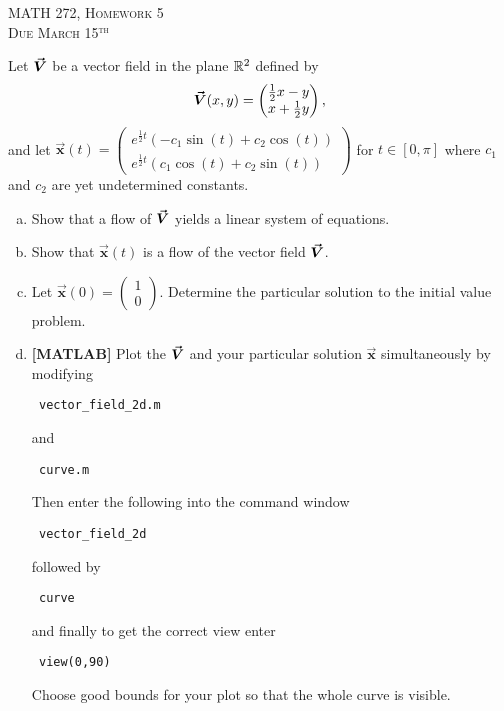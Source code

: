 \documentclass[12pt]{article} %
\newcommand{\vecx}{\boldsymbol{\vec{x}}}
\begin{document}
\begin{center}
   \textsc{\large MATH 272, Homework 5}\\
   \textsc{Due March 15$^\textrm{th}$}
\end{center}
\vspace{.5cm}


\begin{problem}
Let $\boldsymbol{\vec{V}}$ be a vector field in the plane $\mathbb{R}^2$ defined by
\[
\boldsymbol{\vec{V}}(x,y) = \begin{pmatrix} \frac{1}{2}x-y \\ x + \frac{1}{2}y \end{pmatrix},
\]
and let $\vecx(t) = \begin{pmatrix}  e^{\frac{1}{2}t} (-c_1 \sin(t) + c_2 \cos(t) ) \\ e^{\frac{1}{2}t} (c_1 \cos(t) + c_2 \sin(t)) \end{pmatrix}$ for $t\in [0,\pi]$ where $c_1$ and $c_2$ are yet undetermined constants.
\begin{enumerate}[(a)]
    \item Show that a flow of $\boldsymbol{\vec{V}}$ yields a linear system of equations.
    \item Show that $\vecx(t)$ is a flow of the vector field $\boldsymbol{\vec{V}}$.
    \item Let $\vecx(0)=\begin{pmatrix} 1 \\ 0 \end{pmatrix}$. Determine the particular solution to the initial value problem.
    \item \textbf{[MATLAB]} Plot the $\boldsymbol{\vec{V}}$ and your particular solution $\vecx$ simultaneously by modifying 
\begin{verbatim} vector_field_2d.m \end{verbatim}
 and
 \begin{verbatim} curve.m \end{verbatim} 
Then enter the following into the command window
\begin{verbatim} vector_field_2d \end{verbatim}
 followed by 
\begin{verbatim} curve \end{verbatim}
and finally to get the correct view enter
\begin{verbatim} view(0,90) \end{verbatim}
Choose good bounds for your plot so that the whole curve is visible.
\end{enumerate}
\end{problem}
\end{document}
